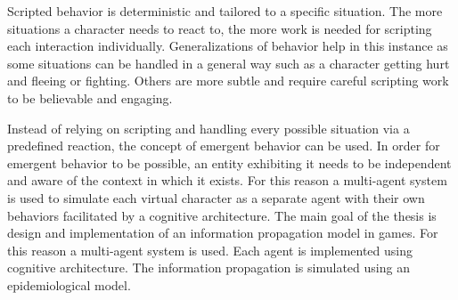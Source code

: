 Scripted behavior is deterministic and tailored to a specific situation.
The more situations a character needs to react to, the more work is needed for scripting each interaction individually.
Generalizations of behavior help in this instance as some situations can be handled in a general way such as a character getting hurt and fleeing or fighting.
Others are more subtle and require careful scripting work to be believable and engaging.

Instead of relying on scripting and handling every possible situation via a predefined reaction, the concept of emergent behavior can be used.
In order for emergent behavior to be possible, an entity exhibiting it needs to be independent and aware of the context in which it exists.
For this reason a multi-agent system is used to simulate each virtual character as a separate agent with their own behaviors facilitated by a cognitive architecture.
The main goal of the thesis is design and implementation of an information propagation model in games.
For this reason a multi-agent system is used.
Each agent is implemented using cognitive architecture.
The information propagation is simulated using an epidemiological model.



